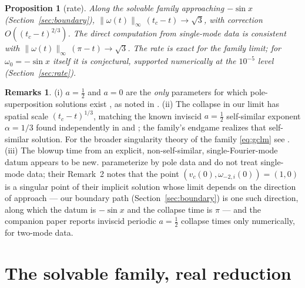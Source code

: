 \documentclass[11pt,a4paper]{article}
\theoremstyle{plain}
\newtheorem{proposition}{Proposition}
\theoremstyle{definition}
\newtheorem*{remarks}{Remarks}
\theoremstyle{plain}
\newcommand{\nrm}[1]{\lVert #1 \rVert}
\begin{document}
\begin{proposition}[rate]\label{prop:rate}
Along the solvable family approaching $-\sin x$ (Section~\ref{sec:boundary}), $\nrm{\omega(t)}_\infty\,(t_c-t)\to\sqrt3$, with correction $O((t_c-t)^{2/3})$. The direct computation from single-mode data is consistent with $\nrm{\omega(t)}_\infty\,(\pi-t)\to\sqrt3$. The rate is exact for the family limit; for $\omega_0=-\sin x$ itself it is conjectural, supported numerically at the $10^{-5}$ level (Section~\ref{sec:rate}).
\end{proposition}

\begin{remarks}
(i) $a=\tfrac12$ and $a=0$ are the \emph{only} parameters for which pole-superposition solutions exist \cite{LSS21}, as noted in \cite{ALSS24}. (ii) The collapse in our limit has spatial scale $(t_c-t)^{1/3}$, matching the known inviscid $a=\tfrac12$ self-similar exponent $\alpha=1/3$ found independently in \cite{LSS21} and \cite{Chen20}; the family's endgame realizes that self-similar solution. For the broader singularity theory of the family \eqref{eq:gclm} see \cite{EJ20,CHH21,HQWW24}. (iii) The blowup time from an explicit, non-self-similar, single-Fourier-mode datum appears to be new. \cite{SLSA25} parameterize by pole data and do not treat single-mode data; their Remark~2 notes that the point $(v_c(0),\omega_{-2,i}(0))=(1,0)$ is a singular point of their implicit solution whose limit depends on the direction of approach --- our boundary path (Section~\ref{sec:boundary}) is one such direction, along which the datum is $-\sin x$ and the collapse time is $\pi$ --- and the companion paper \cite{ALSS24} reports inviscid periodic $a=\tfrac12$ collapse times only numerically, for two-mode data.
\end{remarks}

\section{The solvable family, real reduction}\label{sec:family}
\end{document}
